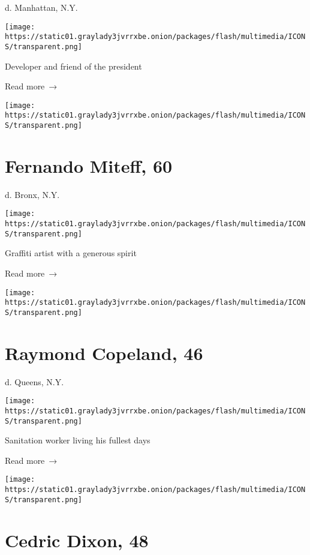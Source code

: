 d. Manhattan, N.Y.

\texttt{[image: https://static01.graylady3jvrrxbe.onion/packages/flash/multimedia/ICONS/transparent.png]}

Developer and friend of the president

 Read more~→

\href{https://www.nytimes3xbfgragh.onion/2020/04/17/nyregion/fernando-miteff-dead-coronavirus.html}{}

\texttt{[image: https://static01.graylady3jvrrxbe.onion/packages/flash/multimedia/ICONS/transparent.png]}

\hypertarget{fernando-miteff-60}{%
\section{Fernando Miteff, 60}\label{fernando-miteff-60}}

d. Bronx, N.Y.

\texttt{[image: https://static01.graylady3jvrrxbe.onion/packages/flash/multimedia/ICONS/transparent.png]}

Graffiti artist with a generous spirit

 Read more~→

\href{https://www.nytimes3xbfgragh.onion/2020/04/17/obituaries/raymond-copeland-dead-coronavirus.html}{}

\texttt{[image: https://static01.graylady3jvrrxbe.onion/packages/flash/multimedia/ICONS/transparent.png]}

\hypertarget{raymond-copeland-46}{%
\section{Raymond Copeland, 46}\label{raymond-copeland-46}}

d. Queens, N.Y.

\texttt{[image: https://static01.graylady3jvrrxbe.onion/packages/flash/multimedia/ICONS/transparent.png]}

Sanitation worker living his fullest days

 Read more~→

\href{https://www.nytimes3xbfgragh.onion/2020/04/16/nyregion/cedric-dixon-dead-coronavirus.html}{}

\texttt{[image: https://static01.graylady3jvrrxbe.onion/packages/flash/multimedia/ICONS/transparent.png]}

\hypertarget{cedric-dixon-48}{%
\section{Cedric Dixon, 48}\label{cedric-dixon-48}}

